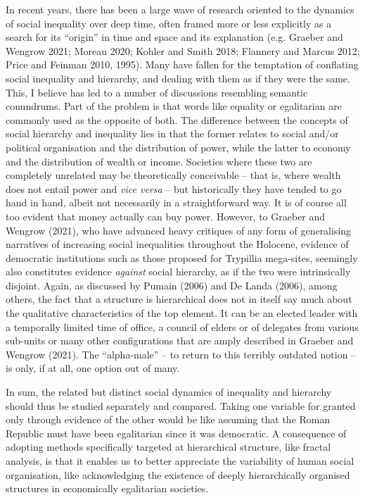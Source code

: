 \documentclass[
  12pt,
  a4paper, twoside]{book}
\begin{document}
In recent years, there has been a large wave of research oriented to the dynamics of social inequality over deep time, often framed more or less explicitly as a search for its ``origin'' in time and space and its explanation (e.g. Graeber and Wengrow 2021; Moreau 2020; Kohler and Smith 2018; Flannery and Marcus 2012; Price and Feinman 2010, 1995). Many have fallen for the temptation of conflating social inequality and hierarchy, and dealing with them as if they were the same. This, I believe has led to a number of discussions resembling semantic conundrums. Part of the problem is that words like equality or egalitarian are commonly used as the opposite of both. The difference between the concepts of social hierarchy and inequality lies in that the former relates to social and/or political organisation and the distribution of power, while the latter to economy and the distribution of wealth or income. Societies where these two are completely unrelated may be theoretically conceivable -- that is, where wealth does not entail power and \emph{vice versa} -- but historically they have tended to go hand in hand, albeit not necessarily in a straightforward way. It is of course all too evident that money actually can buy power. However, to Graeber and Wengrow (2021), who have advanced heavy critiques of any form of generalising narratives of increasing social inequalities throughout the Holocene, evidence of democratic institutions such as those proposed for Trypillia mega-sites, seemingly also constitutes evidence \emph{against} social hierarchy, as if the two were intrinsically disjoint. Again, as discussed by Pumain (2006) and De Landa (2006), among others, the fact that a structure is hierarchical does not in itself say much about the qualitative characteristics of the top element. It can be an elected leader with a temporally limited time of office, a council of elders or of delegates from various sub-units or many other configurations that are amply described in Graeber and Wengrow (2021). The ``alpha-male'' -- to return to this terribly outdated notion -- is only, if at all, one option out of many.

In sum, the related but distinct social dynamics of inequality and hierarchy should thus be studied separately and compared. Taking one variable for granted only through evidence of the other would be like assuming that the Roman Republic must have been egalitarian since it was democratic. A consequence of adopting methods specifically targeted at hierarchical structure, like fractal analysis, is that it enables us to better appreciate the variability of human social organisation, like acknowledging the existence of deeply hierarchically organised structures in economically egalitarian societies.
\end{document}
